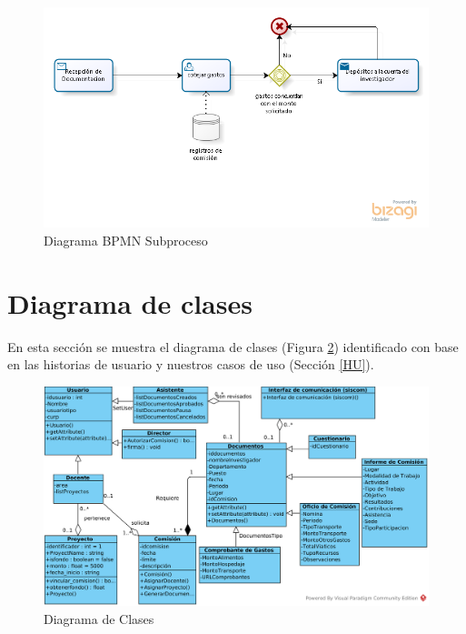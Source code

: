 \documentclass{report}
\begin{document}
    	\begin{figure}[H]
    		\begin{center}
    			\includegraphics[scale=0.80]{images/1models/envioGto.png}
    			\caption{Diagrama BPMN Subproceso}
    		\end{center}
            \label{subProcesoBPMN}
    	\end{figure}
    
    \section{Diagrama de clases}
    En esta sección se muestra el diagrama de clases (Figura \ref{classDiagram}) identificado con base en las historias de usuario y nuestros casos de uso (Sección \ref{HU}).
      	\begin{figure}
            \begin{center}
    			\includegraphics[scale=0.80]{images/1models/DiagramaClases.png}
    			\caption{Diagrama de Clases}
    	    \end{center}
            \label{classDiagram}
    	\end{figure}
       
\end{document}
